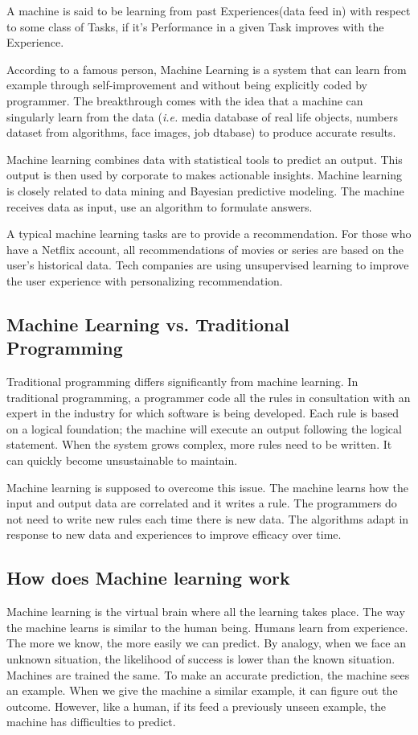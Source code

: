A machine is said to be learning from past Experiences(data feed in) with respect to some class of Tasks, if it's Performance in a given Task improves with the Experience.

According to a famous person, Machine Learning is a system that can learn from example through self-improvement and without being explicitly coded by programmer. The breakthrough comes with the idea that a machine can singularly learn from the data (\textit{i.e.} media database of real life objects, numbers dataset from algorithms, face images, job dtabase) to produce accurate results.

Machine learning combines data with statistical tools to predict an output. This output is then used by corporate to makes actionable insights. Machine learning is closely related to data mining and Bayesian predictive modeling. The machine receives data as input, use an algorithm to formulate answers.

A typical machine learning tasks are to provide a recommendation. For those who have a Netflix account, all recommendations of movies or series are based on the user's historical data. Tech companies are using unsupervised learning to improve the user experience with personalizing recommendation.

\subsection{Machine Learning vs. Traditional Programming}
Traditional programming differs significantly from machine learning. In traditional programming, a programmer code all the rules in consultation with an expert in the industry for which software is being developed. Each rule is based on a logical foundation; the machine will execute an output following the logical statement. When the system grows complex, more rules need to be written. It can quickly become unsustainable to maintain.

Machine learning is supposed to overcome this issue. The machine learns how the input and output data are correlated and it writes a rule. The programmers do not need to write new rules each time there is new data. The algorithms adapt in response to new data and experiences to improve efficacy over time.

\subsection{How does Machine learning work}
Machine learning is the virtual brain where all the learning takes place. The way the machine learns is similar to the human being. Humans learn from experience. The more we know, the more easily we can predict. By analogy, when we face an unknown situation, the likelihood of success is lower than the known situation. Machines are trained the same. To make an accurate prediction, the machine sees an example. When we give the machine a similar example, it can figure out the outcome. However, like a human, if its feed a previously unseen example, the machine has difficulties to predict.


